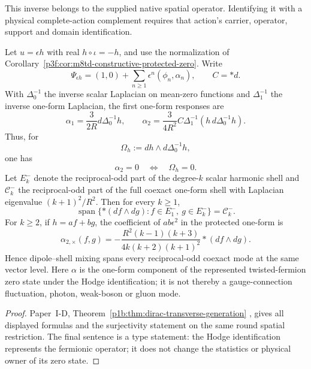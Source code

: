 \documentclass[11pt,a4paper]{article}
\begin{document}
This inverse belongs to the supplied native spatial operator. Identifying
it with a physical complete-action complement requires that action's
carrier, operator, support and domain identification.




\begin{corollary}
\label{p3f:cor:m8td-transverse-zero-response}
Let \(u=\epsilon h\) with real \(h\circ\iota=-h\), and use the
normalization of Corollary~\ref{p3f:cor:m8td-constructive-protected-zero}.
Write
\[
 \Psi_{\epsilon h}=(1,0)+\sum_{n\ge1}\epsilon^n(\phi_n,\alpha_n),
 \qquad C=*d.
\]
With \(\Delta_0^{-1}\) the inverse scalar Laplacian on mean-zero
functions and \(\Delta_1^{-1}\) the inverse one-form Laplacian, the first
one-form responses are
\begin{equation}
 \alpha_1=\frac{3}{2R}d\Delta_0^{-1}h,
 \qquad
 \boxed{\alpha_2=\frac{3}{4R^2}
 C\Delta_1^{-1}\!\left(h\,d\Delta_0^{-1}h\right).}
 \label{p3f:eq:m8td-transverse-response}
\end{equation}
Thus, for
\[
 \Omega_h:=dh\wedge d\Delta_0^{-1}h,
\]
one has
\begin{equation}
 \boxed{\alpha_2=0\quad\Longleftrightarrow\quad\Omega_h=0.}
 \label{p3f:eq:m8td-transverse-onset}
\end{equation}
Let \(E_k^-\) denote the reciprocal-odd part of the degree-\(k\) scalar
harmonic shell and \(\mathcal C_k^-\) the reciprocal-odd part of the full
coexact one-form shell with Laplacian eigenvalue \((k+1)^2/R^2\). Then
for every \(k\ge1\),
\begin{equation}
 \boxed{\operatorname{span}\{*(df\wedge dg):
 f\in E_1^-,\ g\in E_k^-\}=\mathcal C_k^-.}
 \label{p3f:eq:m8td-shell-generation}
\end{equation}
For \(k\ge2\), if \(h=af+bg\), the coefficient of
\(ab\epsilon^2\) in the protected one-form is
\begin{equation}
 \boxed{\alpha_{2,\times}(f,g)=
 -\frac{R^2(k-1)(k+3)}{4k(k+2)(k+1)^2}*(df\wedge dg).}
 \label{p3f:eq:m8td-shell-cross-response}
\end{equation}
Hence dipole--shell mixing spans every reciprocal-odd coexact mode at the
same vector level. Here \(\alpha\) is the one-form component of the
represented twisted-fermion zero state under the Hodge identification;
it is not thereby a gauge-connection fluctuation, photon, weak-boson or
gluon mode.
\end{corollary}
\begin{proof}
Paper~I-D, Theorem~\ref{p1b:thm:dirac-transverse-generation}
\cite{Kugelmann2026Paper1D}, gives all displayed formulas and the
surjectivity statement on the same round spatial restriction. The final
sentence is a type statement: the Hodge identification represents the
fermionic operator; it does not change the statistics or physical owner of
its zero state.
\end{proof}
\end{document}
